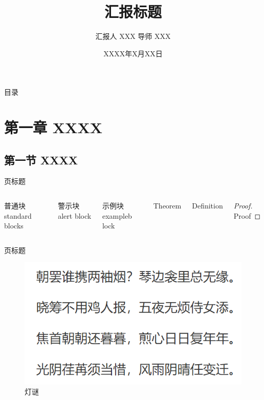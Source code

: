 \documentclass[aspectratio=169, UTF8]{ctexbeamer}
\author{汇报人 XXX\inst{1,2}
\newline  导师 XXX\inst{2}
}
\institute{
\inst{1}中国科学技术大学\quad XXXX系 
\newline \inst{2}中国科学院高能物理研究所
}
\date{XXXX年X月XX日}
\title{汇报标题}
\begin{document}
\begin{frame}
    \maketitle
\end{frame}

\begin{frame}{目录}
    \centering
    \tableofcontents[hideallsubsections]
\end{frame}

\section{第一章 XXXX}
\subsection{第一节 XXXX}

\begin{frame}{页标题}
    \begin{columns}
        \column{.45\paperwidth}
        \begin{block}{普通块}
            standard blocks
        \end{block}
        \begin{alertblock}{警示块}
            alert block
        \end{alertblock}
        \begin{exampleblock}{示例块}
            exampleb lock
        \end{exampleblock}
        \column{.45\paperwidth}
        \begin{theorem}
            Theorem
        \end{theorem}
        \begin{definition}
            Definition
        \end{definition}
        \begin{proof}
            Proof
        \end{proof}
    \end{columns}
    
\end{frame}

\begin{frame}{页标题}
    \begin{figure}
        \includegraphics[height=0.6\textheight]{fig.png}
        \caption{灯谜}
    \end{figure}
\end{frame}
\end{document}
